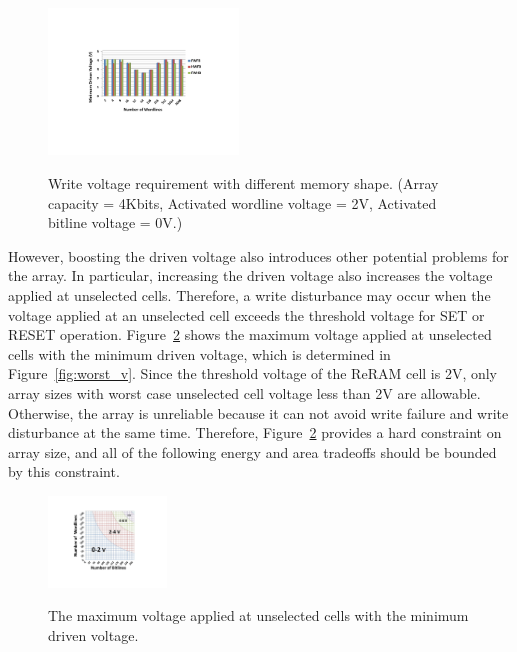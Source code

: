 \begin{figure}%
\centering
  \includegraphics[width=0.45\textwidth]{./figures/shape_f.pdf}\\
  \caption{Write voltage requirement with different memory shape. (Array capacity = 4Kbits, Activated wordline voltage = 2V, Activated bitline voltage = 0V.)}\label{fig:shape}
    \vspace{-15pt}
\end{figure}

However, boosting the driven voltage also introduces other potential
problems for the array. In particular, increasing the driven voltage also
increases the voltage applied at unselected cells. Therefore, a write
disturbance may occur when the voltage applied at an unselected cell
exceeds the threshold voltage for SET or RESET operation.
Figure~\ref{fig:half} shows the maximum voltage applied at unselected
cells with the minimum driven voltage, which is determined in
Figure~\ref{fig:worst_v}. Since the threshold voltage of the ReRAM cell is
2V, only array sizes with worst case unselected cell voltage less than 2V
are allowable. Otherwise, the array is unreliable because it can not avoid
write failure and write disturbance at the same time. Therefore,
Figure~\ref{fig:half} provides a hard constraint on array size, and all of
the following energy and area tradeoffs should be bounded by this
constraint.

\begin{figure}%
\centering
  \includegraphics[width=0.28\textwidth]{./figures/Theoretical_bound_f.pdf}\\
  \caption{The maximum voltage applied at unselected cells with the minimum driven voltage.}\label{fig:half}
  \vspace{-10pt}
\end{figure}


